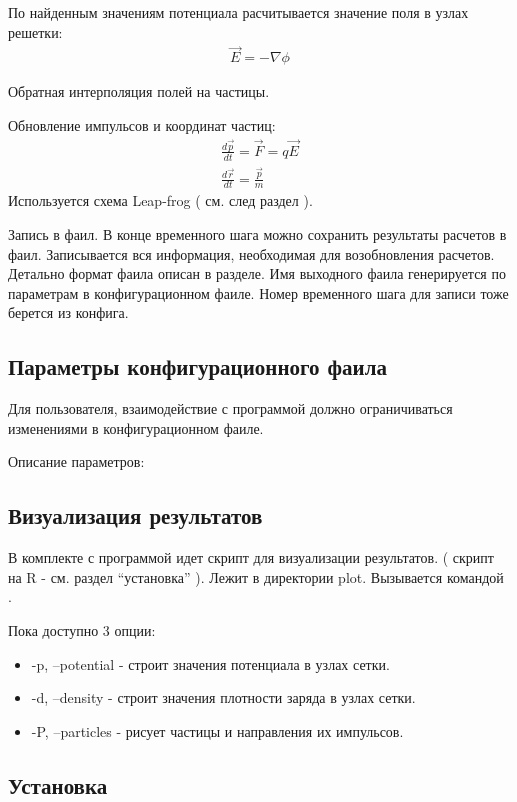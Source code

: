 По найденным значениям потенциала расчитывается значение поля в узлах решетки:
\begin{gather}
  \vec{ E } = - \nabla \phi
\end{gather}

Обратная интерполяция полей на частицы.

Обновление импульсов и координат частиц:
\begin{gather}
  \frac{ d \vec{p} }{ d t } = \vec{ F } = q \vec{ E }
  \\
  \frac{ d \vec{r} }{ d t } = \frac{ \vec{p} }{ m }
\end{gather}
Используется схема Leap-frog ( см. след раздел ).

Запись в фаил. 
В конце временного шага можно сохранить результаты расчетов в фаил. 
Записывается вся информация, необходимая для возобновления расчетов.
Детально формат фаила описан в  разделе. 
Имя выходного фаила генерируется по параметрам в конфигурационном фаиле.
Номер временного шага для записи тоже берется из конфига.




\subsection{ Параметры конфигурационного фаила }

Для пользователя, взаимодействие с программой должно ограничиваться изменениями в конфигурационном фаиле.


Описание параметров:

\subsection{ Визуализация результатов }

В комплекте с программой идет скрипт для визуализации результатов.
( скрипт на R - см. раздел ``установка'' ).
Лежит в директории plot. Вызывается командой .

Пока доступно 3 опции: 
\begin{itemize}
\item -p, --potential - строит значения потенциала в узлах сетки.
\item -d, --density - строит значения плотности заряда в узлах сетки.
\item -P, --particles - рисует частицы и направления их импульсов.
\end{itemize}

\subsection{ Установка }
